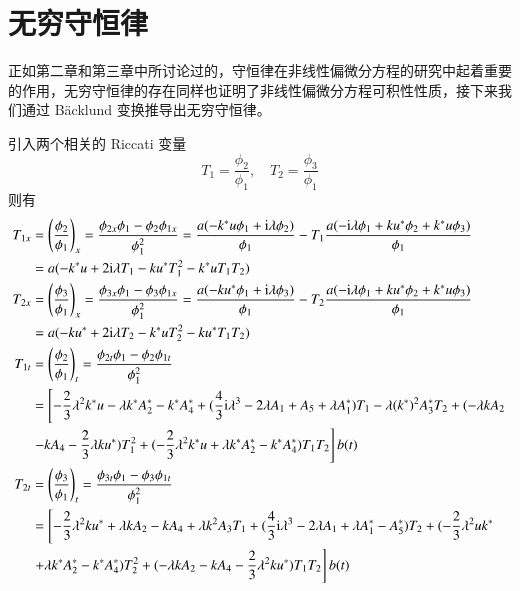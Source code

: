 \section{无穷守恒律}
正如第二章和第三章中所讨论过的，守恒律在非线性偏微分方程的研究中起着重要的作用，无穷守恒律的存在同样也证明了非线性偏微分方程可积性性质，接下来我们通过 B\"{a}cklund 变换推导出无穷守恒律。

引入两个相关的 Riccati 变量
\begin{equation}
  T_{1} = \frac{\phi_{2}}{\phi_{1}}, \quad T_{2} = \frac{\phi_{3}}{\phi_{1}}
\end{equation}
则有
\begin{align}
  T_{1x} &= \left(\frac{\phi_2}{\phi_1}\right)_x=\frac{\phi_{2x}\phi_1-\phi_2\phi_{1x}}{\phi_1^2}=\frac{a(-k^*u\phi_1+\mathrm{i}\lambda\phi_2)}{\phi_1}-T_1\frac{a(-\mathrm{i}\lambda\phi_1+ku^*\phi_2+k^*u\phi_3)}{\phi_1}\nonumber\\
  &= a(-k^{*}u + 2\mathrm{i}\lambda T_{1} - ku^{*}T_{1}^{2} - k^{*}uT_{1}T_{2}) \label{nss-t1x} \\
  T_{2x} &=\left(\frac{\phi_3}{\phi_1}\right)_x=\frac{\phi_{3x}\phi_1-\phi_3\phi_{1x}}{\phi_1^2}=\frac{a(-ku^*\phi_1+\mathrm{i}\lambda\phi_3)}{\phi_1}-T_2\frac{a(-\mathrm{i}\lambda\phi_1+ku^*\phi_2+k^*u\phi_3)}{\phi_1}\nonumber\\
  &= a(-ku^{*} + 2\mathrm{i}\lambda T_{2} - k^{*}uT_{2}^{2} - ku^{*}T_{1}T_{2}) \label{nss-t2x} \\
  T_{1t}  &=\left(\frac{\phi_2}{\phi_1}\right)_t=\frac{\phi_{2t}\phi_1-\phi_2\phi_{1t}}{\phi_1^2}\nonumber\\
  &= \left[-\frac{2}{3}\lambda^{2}k^{*}u - \lambda k^{*}A_{2}^{*} - k^{*}A_{4}^{*} + (\frac{4}{3}\mathrm{i}\lambda^{3}-2\lambda A_{1}+A_{5}+\lambda A_{1}^{*})T_{1} - \lambda (k^{*})^{2}A_{3}^{*}T_{2} + (-\lambda kA_{2} \right.\notag\\
  & \left. - kA_{4} - \frac{2}{3}\lambda ku^{*})T_{1}^{2} + (-\frac{2}{3}\lambda^{2}k^{*}u+\lambda k^{*}A_{2}^{*}-k^{*}A_{4}^{*})T_{1}T_{2} \right]b(t) \\
  T_{2t} &=\left(\frac{\phi_3}{\phi_1}\right)_t=\frac{\phi_{3t}\phi_1-\phi_3\phi_{1t}}{\phi_1^2}\nonumber\\
  &= \left[-\frac{2}{3}\lambda^{2}ku^{*} + \lambda kA_{2} - kA_{4} + \lambda k^{2}A_{3}T_{1} + (\frac{4}{3}\mathrm{i}\lambda^{3}-2\lambda A_{1}+\lambda A_{1}^{*}-A_{5}^{*})T_{2} + (-\frac{2}{3}\lambda^{2}uk^{*} \right. \notag\\
  & \left. +\lambda k^{*}A_{2}^{*}-k^{*}A_{4}^{*})T_{2}^{2} + (-\lambda kA_{2}-kA_{4}-\frac{2}{3}\lambda^{2}ku^{*})T_{1}T_{2} \right]b(t)
\end{align}
